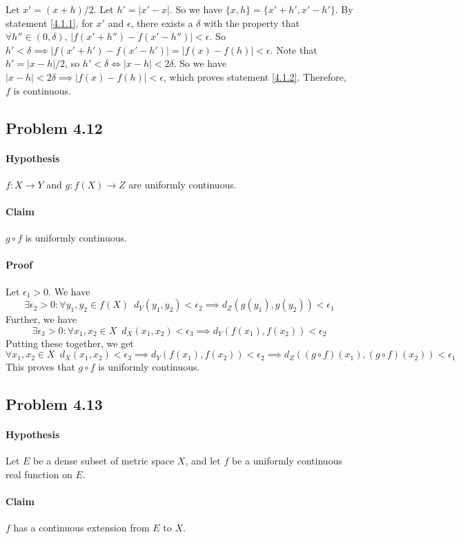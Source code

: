 \documentclass[11pt,letterpaper]{article}
\begin{document}
Let $x' = (x+h)/2$. Let $h' = |x'-x|$. So we have $\{x,h\}=\{x'+h',x'-h'\}$. By statement \ref{4.1.1}, for $x'$ and $\epsilon$, there exists a $\delta$ with the property that $\forall h'' \in (0, \delta),\,|f(x'+h'')-f(x'-h'')|<\epsilon$. So $h' < \delta \implies |f(x'+h')-f(x'-h')|=|f(x)-f(h)|<\epsilon$. Note that $h' = |x-h|/2$, so $h' < \delta \iff |x-h| < 2\delta$. So we have $|x-h| < 2\delta \implies |f(x)-f(h)|<\epsilon$, which proves statement \ref{4.1.2}. Therefore, $f$ is continuous. 

\subsection*{Problem 4.12}
\paragraph{Hypothesis} $f:X \rightarrow Y$ and $g: f(X) \rightarrow Z$ are uniformly continuous.
\paragraph{Claim} $g \circ f$ is uniformly continuous.
\paragraph{Proof} Let $\epsilon_1 > 0$. We have
\[ \exists\epsilon_2>0 : \forall y_1,y_2 \in f(X) \,\,\, d_Y(y_1,y_2)<\epsilon_2 \implies d_Z(g(y_1),g(y_2))<\epsilon_1 \]
Further, we have
\[ \exists\epsilon_3>0 : \forall x_1,x_2 \in X \,\,\, d_X(x_1,x_2)<\epsilon_3 \implies d_Y(f(x_1),f(x_2))<\epsilon_2 \]
Putting these together, we get
\[ \forall x_1,x_2 \in X \,\,\, d_X(x_1,x_2)<\epsilon_3 \implies d_Y(f(x_1),f(x_2))<\epsilon_2 \implies d_Z((g \circ f)(x_1),(g \circ f)(x_2))<\epsilon_1 \]
This proves that $g \circ f$ is uniformly continuous. 

\subsection*{Problem 4.13}
\paragraph{Hypothesis} Let $E$ be a dense subset of metric space $X$, and let $f$ be a uniformly continuous real function on $E$. 
\paragraph{Claim} $f$ has a continuous extension from $E$ to $X$.
\end{document}
